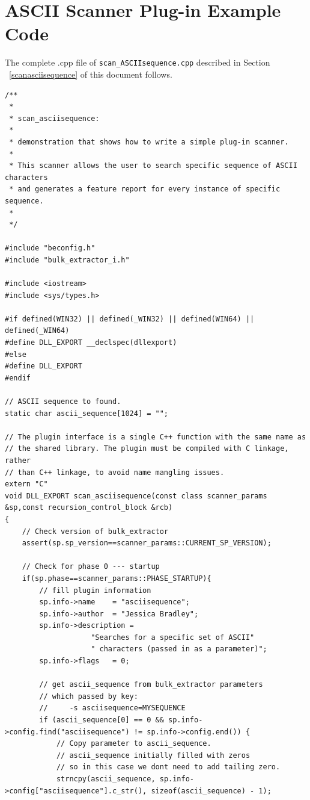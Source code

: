 \documentclass[11pt,fleqn]{article} %
\begin{document}
 


\newpage
\appendix
\appendixpage


\section{ASCII Scanner Plug-in Example Code}
The complete .cpp file of \texttt{scan\_ASCIIsequence.cpp} described in Section ~\ref{scanasciisequence} of this document follows.
\lstset{language=C++}
\lstset{basicstyle=\footnotesize}
\lstset{breaklines=true}
\lstset{breakatwhitespace=true}
\begin{lstlisting}[frame=single]
/**
 *
 * scan_asciisequence:
 *
 * demonstration that shows how to write a simple plug-in scanner.
 *
 * This scanner allows the user to search specific sequence of ASCII characters
 * and generates a feature report for every instance of specific sequence.
 *
 */

#include "beconfig.h"
#include "bulk_extractor_i.h"

#include <iostream>
#include <sys/types.h>

#if defined(WIN32) || defined(_WIN32) || defined(WIN64) || defined(_WIN64)
#define DLL_EXPORT __declspec(dllexport)
#else
#define DLL_EXPORT
#endif

// ASCII sequence to found.
static char ascii_sequence[1024] = "";

// The plugin interface is a single C++ function with the same name as
// the shared library. The plugin must be compiled with C linkage, rather
// than C++ linkage, to avoid name mangling issues.
extern "C"
void DLL_EXPORT scan_asciisequence(const class scanner_params &sp,const recursion_control_block &rcb)
{
	// Check version of bulk_extractor
	assert(sp.sp_version==scanner_params::CURRENT_SP_VERSION);

    // Check for phase 0 --- startup
    if(sp.phase==scanner_params::PHASE_STARTUP){
    	// fill plugin information
    	sp.info->name    = "asciisequence";
    	sp.info->author  = "Jessica Bradley";
    	sp.info->description =
    				"Searches for a specific set of ASCII"
    				" characters (passed in as a parameter)";
    	sp.info->flags   = 0;

    	// get ascii_sequence from bulk_extractor parameters
    	// which passed by key:
    	//     -s asciisequence=MYSEQUENCE
    	if (ascii_sequence[0] == 0 && sp.info->config.find("asciisequence") != sp.info->config.end()) {
    		// Copy parameter to ascii_sequence.
    		// ascii_sequence initially filled with zeros
    		// so in this case we dont need to add tailing zero.
			strncpy(ascii_sequence, sp.info->config["asciisequence"].c_str(), sizeof(ascii_sequence) - 1);


\end{lstlisting}
\end{document}
